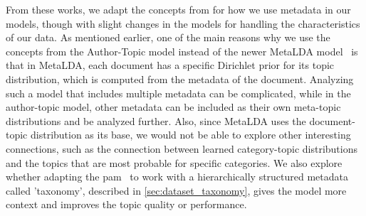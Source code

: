 From these works, we adapt the concepts from \citet{author_topic_2012} for how we use metadata in our models, though with slight changes in the models for handling the characteristics of our data.
As mentioned earlier, one of the main reasons why we use the concepts from the Author-Topic model instead of the newer MetaLDA model~\cite{MetaLDA2017} is that in MetaLDA, each document has a specific Dirichlet prior for its topic distribution, which is computed from the metadata of the document.
Analyzing such a model that includes multiple metadata can be complicated, while in the author-topic model, other metadata can be included as their own meta-topic distributions and be analyzed further.
Also, since MetaLDA uses the document-topic distribution as its base, we would not be able to explore other interesting connections, such as the connection between learned category-topic distributions and the topics that are most probable for specific categories.
We also explore whether adapting the \gls{pam}~\cite{li2006pachinko} to work with a hierarchically structured metadata called 'taxonomy', described in \autoref{sec:dataset_taxonomy}, gives the model more context and improves the topic quality or performance.
